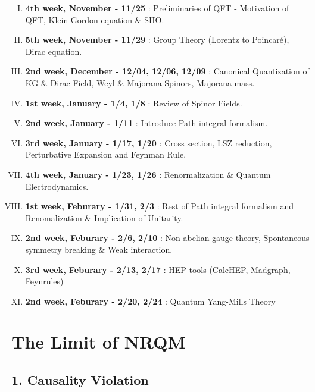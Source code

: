 \documentclass[11pt,letterpaper]{article}
\begin{document}
\begin{enumerate}[I.]
 \item \textbf{4th week, November - 11/25} \newline
 : Preliminaries of QFT - Motivation of QFT, Klein-Gordon equation \& SHO.
 \item \textbf{5th week, November - 11/29} \newline
 : Group Theory (Lorentz to Poincar\'e), Dirac equation.
 \item \textbf{2nd week, December - 12/04, 12/06, 12/09} \newline
 : Canonical Quantization of KG \& Dirac Field, Weyl \& Majorana Spinors, Majorana mass.
 \item \textbf{1st week, January - 1/4, 1/8} \newline
 : Review of Spinor Fields.
 \item \textbf{2nd week, January - 1/11} \newline
 : Introduce Path integral formalism.
 \item \textbf{3rd week, January - 1/17, 1/20} \newline
 : Cross section, LSZ reduction, Perturbative Expansion and Feynman Rule.
 \item \textbf{4th week, January - 1/23, 1/26} \newline
 : Renormalization \& Quantum Electrodynamics.
 \item \textbf{1st week, Feburary - 1/31, 2/3} \newline
 : Rest of Path integral formalism and Renomalization \& Implication of Unitarity.
 \item \textbf{2nd week, Feburary - 2/6, 2/10} \newline
 : Non-abelian gauge theory, Spontaneous symmetry breaking \& Weak interaction.
 \item \textbf{3rd week, Feburary - 2/13, 2/17} \newline
 : HEP tools (CalcHEP, Madgraph, Feynrules)
 \item \textbf{2nd week, Feburary - 2/20, 2/24} \newline
 : Quantum Yang-Mills Theory
\end{enumerate}

\newpage

\section*{The Limit of NRQM}

\subsection*{1. Causality Violation}
\end{document}

